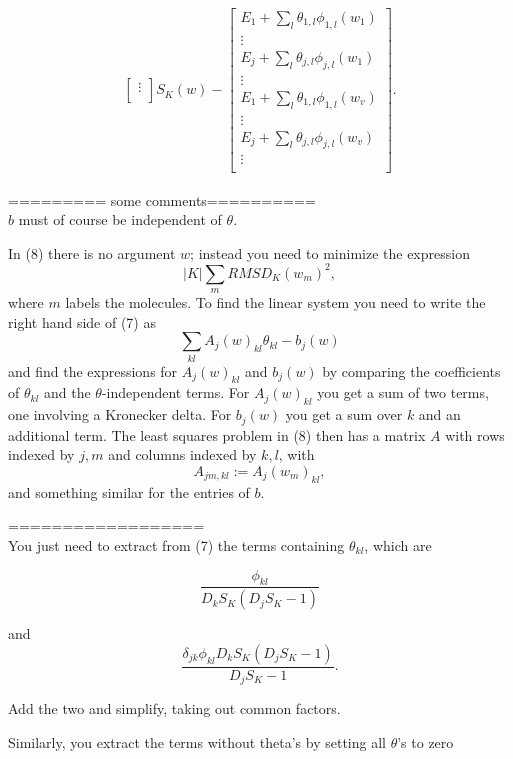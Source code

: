 \documentclass[12pt]{article}
\begin{document}
\begin{equation}
\begin{split}
{\begin{bmatrix}
                \vdots \\
            \end{bmatrix}
        }{S_K(w)}
        - 
        \begin{bmatrix}
            E_1 + \sum_l \theta_{1,l} \phi_{1,l}(w_1) \\
            \vdots \\
            E_j + \sum_l \theta_{j,l} \phi_{j,l}(w_1) \\
            \vdots \\
            E_1 + \sum_l \theta_{1,l} \phi_{1,l}(w_v) \\
            \vdots \\
            E_j + \sum_l \theta_{j,l} \phi_{j,l}(w_v) \\
            \vdots \\
        \end{bmatrix}
        .
    \end{split}
\end{equation}
\fi


========= some comments========== \\
$b$ must of course be independent of $\theta$.

In (8) there is no argument $w$; instead you need to minimize the expression
\begin{equation}
    |K| \sum_m RMSD_K(w_m)^2,
\end{equation}
where $m$ labels the molecules. To find the linear system you need to write the right hand side of (7) as
\begin{equation}
    \sum_{kl} A_j(w)_{kl} \theta_{kl} -b_j(w)
\end{equation}
and find the expressions for $A_j(w)_{kl}$ and $b_j(w)$ by comparing the coefficients of $\theta_{kl}$ and the $\theta$-independent terms. For $A_j(w)_{kl}$ you get a sum of two terms, one involving a Kronecker delta. For $b_j(w)$ you get a sum over $k$ and an additional term.
The least squares problem in (8) then has a matrix $A$ with rows indexed by $j,m$ and columns indexed by $k,l$, with
\begin{equation}
    A_{jm,kl}:=A_j(w_m)_{kl},
\end{equation}
and something similar for the entries of $b$.

================== \\
You just need to extract from (7) the terms containing $\theta_{kl}$, which are

\begin{equation}
    \frac{\phi_{kl}}{D_kS_K(D_jS_K-1)}
\end{equation}


and
\begin{equation}
    \frac{\delta_{jk}\phi_{kl}D_kS_K(D_jS_K-1)}{D_jS_K-1}.
\end{equation}


Add the two and simplify, taking out common factors.

Similarly, you extract the terms without theta's by setting all $\theta$'s to zero
\end{document}
